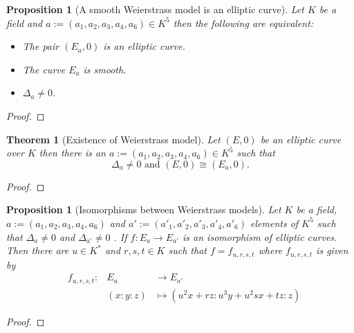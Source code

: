 \documentclass[a4paper,12pt,reqno]{amsart}
\newtheorem{theorem}[lemma]{Theorem}
\newtheorem{proposition}[lemma]{Proposition}
\theoremstyle{definition}
\numberwithin{lemma}{section}
\numberwithin{equation}{section}
\numberwithin{figure}{section}
\begin{document}
\begin{proposition}[A smooth Weierstrass model is an elliptic curve]\label{stmt:smooth-weierstrass-over-k-is-ec}
Let $K$ be a field and $a :=  (a_1,a_2,a_3,a_4,a_6) \in K^5$ then the following are equivalent:
\begin{itemize}[label=-]
	\item The pair $(E_{a},0)$ is an elliptic curve.
	\item The curve $E_{a}$ is smooth.
    \item $\Delta_a \neq 0$.
\end{itemize}
\end{proposition}
\begin{proof}
\end{proof}



\begin{theorem}[Existence of Weierstrass model]\label{stmt:ec-over-k-has-weierstrass-model}
Let $(E,0)$ be an elliptic curve over $K$ then there is an $a := (a_1,a_2,a_3,a_4,a_6) \in K^5$ such that
$$\Delta_{a} \neq 0 \text{ and } (E,0) \cong (E_{a},0).$$
\end{theorem}
\begin{proof}
\end{proof}

\begin{proposition}[Isomorphisms between Weierstrass models]\label{stmt:iso-between-weierstrass-over-K-is-urst}
	Let $K$ be a field,  $a := (a_1,a_2,a_3,a_4,a_6)$  and $a' := (a'_1,a'_2,a'_3,a'_4,a'_6) $ elements of $K^5$ such that $\Delta_a \neq 0$ and $\Delta_{a'} \neq 0$ . If $f : E_a \to E_{a'}$ is an isomorphism of elliptic curves. Then there are $u \in K^*$ and $r,s,t \in K$ such that $f=f_{u,r,s,t}$ where $f_{u,r,s,t}$ is given by
\begin{align}
&f_{u,r,s,t} : &E_a &\to E_{a'} \label{eq:weierstrass-isomorphism} \\
& &(x:y:z) & \mapsto (u^2x+rz:u^3y+u^2sx+tz:z) \nonumber
\end{align}
\end{proposition}
\begin{proof}
\end{proof}
\end{document}
